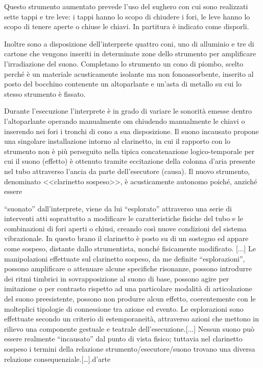 Questo strumento aumentato prevede l’uso del sughero con cui sono realizzati
sette tappi e tre leve: i tappi hanno lo scopo di chiudere i fori, le  leve
hanno lo scopo di tenere aperte o chiuse le chiavi. In partitura è indicato come
disporli.

Inoltre sono a disposizione dell’interprete quattro coni, uno di alluminio e tre
di cartone che vengono inseriti in determinate zone dello strumento per
amplificare l’irradiazione del suono.
Completano lo strumento un cono di piombo, scelto perché è un materiale
acusticamente isolante ma non fonoassorbente, inserito al posto del bocchino
contenente un altoparlante e un’asta di metallo su cui lo stesso strumento è
fissato.

Durante l’esecuzione l’interprete è in grado di variare le sonorità emesse
dentro l’altoparlante operando manualmente om chiudendo manualmente le chiavi o
inserendo nei fori i tronchi di cono a sua disposizione.
Il suono incausato propone una singolare installazione intorno al clarinetto, in
cui il rapporto con lo strumento non è più perseguito nella tipica concatenazione
logico-temporale per cui il suono (effetto) è ottenuto tramite eccitazione della
colonna d’aria presente nel tubo attraverso l’ancia da parte dell’esecutore
(causa). Il nuovo strumento, denominato <<clarinetto sospeso>>, è acusticamente
autonomo poiché, anziché essere

“suonato” dall’interprete, viene da lui “esplorato” attraverso una serie di
interventi atti soprattutto a modificare le caratteristiche fisiche del tubo e
le combinazioni di fori aperti o chiusi, creando così nuove condizioni del
sistema vibrazionale. In questo brano il clarinetto è posto su di un sostegno
ed appare come sospeso, distante dallo strumentista, nonché fisicamente
modificato. [...] Le manipolazioni effettuate sul clarinetto sospeso, da me
definite “esplorazioni”, possono amplificare o attenuare alcune specifiche
risonanze, possono introdurre dei ritmi timbrici in sovrapposizione al suono di
base, possono agire per imitazione o per contrasto rispetto ad una particolare
modalità di articolazione del suono preesistente, possono non produrre alcun
effetto, coerentemente con le molteplici tipologie di connessione tra azione ed
evento. Le esplorazioni sono effettuate secondo un criterio di estemporaneità,
attraverso azioni che mettono in rilievo una componente gestuale e teatrale
dell’esecuzione.[...]
Nessun suono può essere realmente “incausato” dal punto di vista fisico;
tuttavia nel clarinetto sospeso i termini della relazione strumento/esecutore/suono
trovano una diversa relazione consequenziale.[…].d’arte


